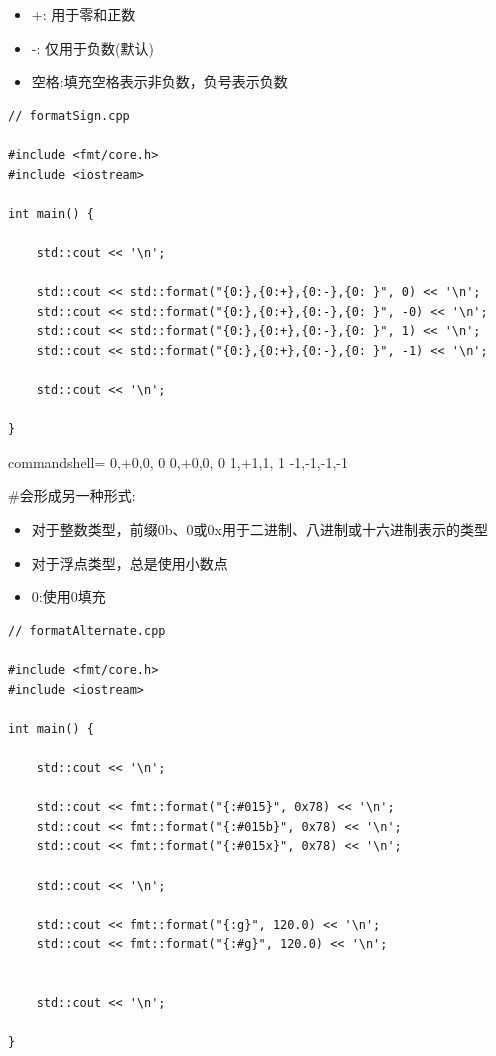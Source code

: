 \begin{itemize}
\item 
+: 用于零和正数

\item 
-: 仅用于负数(默认)

\item 
空格:填充空格表示非负数，负号表示负数
\end{itemize}

\begin{lstlisting}[style=styleCXX]
// formatSign.cpp

#include <fmt/core.h>
#include <iostream>

int main() {
	
	std::cout << '\n';
	
	std::cout << std::format("{0:},{0:+},{0:-},{0: }", 0) << '\n';
	std::cout << std::format("{0:},{0:+},{0:-},{0: }", -0) << '\n';
	std::cout << std::format("{0:},{0:+},{0:-},{0: }", 1) << '\n';
	std::cout << std::format("{0:},{0:+},{0:-},{0: }", -1) << '\n';
	
	std::cout << '\n';
	
}
\end{lstlisting}

\begin{tcblisting}{commandshell={}}
0,+0,0, 0
0,+0,0, 0
1,+1,1, 1
-1,-1,-1,-1
\end{tcblisting}

\#会形成另一种形式:

\begin{itemize}
\item 
对于整数类型，前缀0b、0或0x用于二进制、八进制或十六进制表示的类型

\item 
对于浮点类型，总是使用小数点

\item 
0:使用0填充
\end{itemize}

\begin{lstlisting}[style=styleCXX]
// formatAlternate.cpp

#include <fmt/core.h>
#include <iostream>

int main() {

	std::cout << '\n';
	
	std::cout << fmt::format("{:#015}", 0x78) << '\n';
	std::cout << fmt::format("{:#015b}", 0x78) << '\n';
	std::cout << fmt::format("{:#015x}", 0x78) << '\n';
	
	std::cout << '\n';
	
	std::cout << fmt::format("{:g}", 120.0) << '\n';
	std::cout << fmt::format("{:#g}", 120.0) << '\n';
	
	
	std::cout << '\n';

}
\end{lstlisting}

